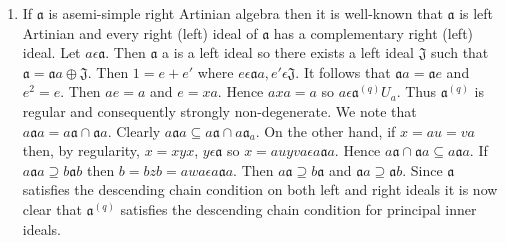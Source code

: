 \begin{examples*}
\begin{enumerate}
\item If $\mathfrak{a}$ is asemi-simple right Artinian algebra then it
 is well-known that $\mathfrak{a}$ is left Artinian and every right
 (left) ideal of $\mathfrak{a}$ has a complementary right (left)
 ideal. Let $a\epsilon \mathfrak{a}$. Then $\mathfrak{a}$ a is a left
 ideal so there exists a left ideal $\mathfrak{J}$ such that
 $\mathfrak{a}=\mathfrak{a}a\oplus \mathfrak{J}$. Then $1=e+e'$ where
 $e\epsilon \mathfrak{a} a, e'\epsilon \mathfrak{J}$. It follows that
 $\mathfrak{a}a=\mathfrak{a} e$ and $e^{2}=e$. Then $ae=a$ and
 $e=xa$. Hence $ax a=a$ so $a\epsilon \mathfrak{a}^{(q)}U_a$. Thus
 $\mathfrak{a}^{(q)}$ is regular and consequently strongly
 non-degenerate. We note that
 $a\mathfrak{a}a=a\mathfrak{a}\cap\mathfrak{a}a$. Clearly
 $a\mathfrak{a}a\subseteq a \mathfrak{a} \cap a\mathfrak{a}_a$. On the
 other hand, if 
 $x=au=va$ then, by regularity, $x=xyx$, $y\epsilon \mathfrak{a}$ so
 $x=auyva \epsilon a\mathfrak{a} a$. Hence $a \mathfrak{a}\cap
   \mathfrak{a}a \subseteq a \mathfrak{a} a$. If $a\mathfrak{a} a
 \supseteq b\mathfrak{a} b$ then $b=bzb=awa\epsilon a\mathfrak{a}
 a$. Then $a\mathfrak{a}\supseteq b \mathfrak{a}$ and $\mathfrak{a} a
 \supseteq \mathfrak{a}b$. Since $\mathfrak{a}$ satisfies the
 descending chain condition on both left and right ideals it is now
 clear that $\mathfrak{a}^{(q)}$ satisfies the descending chain
 condition for principal inner ideals.


\end{enumerate}
\end{examples*}
